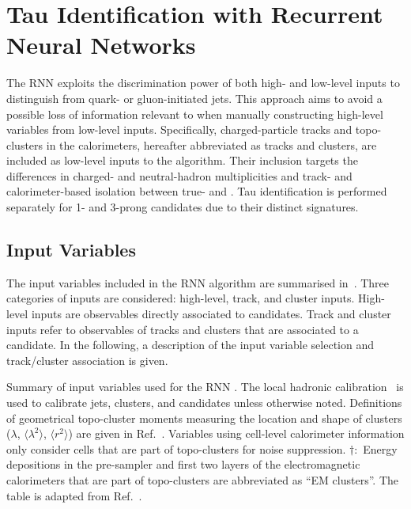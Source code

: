 \section{Tau Identification with Recurrent Neural Networks}%
\label{sec:tauid_rnn}

The RNN \tauid exploits the discrimination power of both high- and low-level
inputs to distinguish \tauhad from quark- or gluon-initiated jets. This approach
aims to avoid a possible loss of information relevant to \tauid when manually
constructing high-level variables from low-level inputs. Specifically,
charged-particle tracks and topo-clusters in the calorimeters, hereafter
abbreviated as tracks and clusters, are included as low-level inputs to the
algorithm. Their inclusion targets the differences in charged- and
neutral-hadron multiplicities and track- and calorimeter-based isolation between
true- and \faketauhadvis. Tau identification is performed separately for 1- and
3-prong \tauhadvis candidates due to their distinct signatures.


\subsection{Input Variables}

The input variables included in the RNN \tauid algorithm are summarised
in~. Three categories of inputs are considered:
high-level, track, and cluster inputs. High-level inputs are observables
directly associated to \tauhadvis candidates. Track and cluster inputs refer to
observables of tracks and clusters that are associated to a \tauhadvis
candidate. In the following, a description of the input variable selection and
track/cluster association is given.

\begin{table}[htbp]
  \centering

  \caption[Input variables used for the RNN \tauid.]{Summary of input variables
    used for the RNN \tauid. The local hadronic calibration~\cite{PERF-2014-07}
    is used to calibrate jets, clusters, and \tauhadvis candidates unless
    otherwise noted. Definitions of geometrical topo-cluster moments measuring
    the location and shape of clusters ($\lambda$, $\langle \lambda^2 \rangle$,
    $\langle r^2 \rangle$) are given in Ref.~\cite{PERF-2014-07}. Variables
    using cell-level calorimeter information only consider cells that are part
    of topo-clusters for noise suppression. $\dagger$:~Energy depositions in the
    pre-sampler and first two layers of the electromagnetic calorimeters that
    are part of topo-clusters are abbreviated as ``EM clusters''. The table is
    adapted from Ref.~\cite{ATL-PHYS-PUB-2019-033}.}%
  \label{tab:tauid_input_variables}

  \resizebox{0.99\textwidth}{!}{
    
  }
\end{table}

